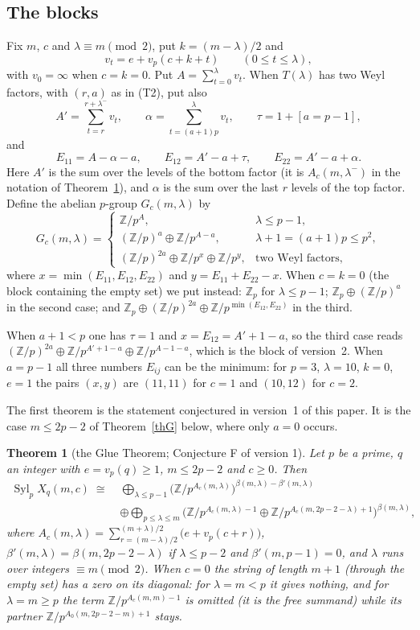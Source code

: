 \documentclass[10pt]{article}
\theoremstyle{ds}
\newtheorem{theorem}{Theorem}
\theoremstyle{dsrem}
\newcommand{\Z}{\mathbb{Z}}
\newcommand{\Syl}{\operatorname{Syl}}
\begin{document}
\subsection{The blocks}
Fix $m$, $c$ and $\lambda\equiv m\pmod2$, put $k=(m-\lambda)/2$ and
\[
v_t=e+v_p(c+k+t)\qquad(0\le t\le\lambda),
\]
with $v_0=\infty$ when $c=k=0$. Put $A=\sum_{t=0}^{\lambda}v_t$. When $T(\lambda)$ has two Weyl factors, with $(r,a)$ as in (T2), put also
\[
A'=\sum_{t=r}^{r+\lambda^-}v_t,\qquad \alpha=\sum_{t=(a+1)p}^{\lambda}v_t,\qquad \tau=1+[a=p-1],
\]
and
\[
E_{11}=A-\alpha-a,\qquad E_{12}=A'-a+\tau,\qquad E_{22}=A'-a+\alpha.
\]
Here $A'$ is the sum over the levels of the bottom factor (it is $A_c(m,\lambda^-)$ in the notation of Theorem~\ref{glue}), and $\alpha$ is the sum over the last $r$ levels of the top factor. Define the abelian $p$-group $G_c(m,\lambda)$ by
\[
G_c(m,\lambda)=\begin{cases}
\Z/p^{A}, & \lambda\le p-1,\\[2pt]
(\Z/p)^{a}\oplus\Z/p^{A-a}, & \lambda+1=(a+1)p\le p^2,\\[2pt]
(\Z/p)^{2a}\oplus\Z/p^{x}\oplus\Z/p^{y}, & \text{two Weyl factors},
\end{cases}
\]
where $x=\min(E_{11},E_{12},E_{22})$ and $y=E_{11}+E_{22}-x$. When $c=k=0$ (the block containing the empty set) we put instead: $\Z_p$ for $\lambda\le p-1$; $\Z_p\oplus(\Z/p)^a$ in the second case; and $\Z_p\oplus(\Z/p)^{2a}\oplus\Z/p^{\min(E_{12},E_{22})}$ in the third.

When $a+1<p$ one has $\tau=1$ and $x=E_{12}=A'+1-a$, so the third case reads $(\Z/p)^{2a}\oplus\Z/p^{A'+1-a}\oplus\Z/p^{A-1-a}$, which is the block of version~2. When $a=p-1$ all three numbers $E_{ij}$ can be the minimum: for $p=3$, $\lambda=10$, $k=0$, $e=1$ the pairs $(x,y)$ are $(11,11)$ for $c=1$ and $(10,12)$ for $c=2$.

The first theorem is the statement conjectured in version~1 of this paper. It is the case $m\le2p-2$ of Theorem~\ref{thG} below, where only $a=0$ occurs.

\begin{theorem}[the Glue Theorem; Conjecture F of version 1]\label{glue}
Let $p$ be a prime, $q$ an integer with $e=v_p(q)\ge1$, $m\le2p-2$ and $c\ge0$. Then
\[
\begin{aligned}\Syl_pX_q(m,c)\;\cong\;&\bigoplus_{\lambda\le p-1}\big(\Z/p^{A_c(m,\lambda)}\big)^{\beta(m,\lambda)-\beta'(m,\lambda)}\\&\oplus\bigoplus_{p\le\lambda\le m}\Big(\Z/p^{A_c(m,\lambda)-1}\oplus\Z/p^{A_c(m,2p-2-\lambda)+1}\Big)^{\beta(m,\lambda)},\end{aligned}
\]
where $A_c(m,\lambda)=\sum_{r=(m-\lambda)/2}^{(m+\lambda)/2}\big(e+v_p(c+r)\big)$, $\beta'(m,\lambda)=\beta(m,2p-2-\lambda)$ if $\lambda\le p-2$ and $\beta'(m,p-1)=0$, and $\lambda$ runs over integers $\equiv m\pmod2$. When $c=0$ the string of length $m+1$ (through the empty set) has a zero on its diagonal: for $\lambda=m<p$ it gives nothing, and for $\lambda=m\ge p$ the term $\Z/p^{A_c(m,m)-1}$ is omitted (it is the free summand) while its partner $\Z/p^{A_0(m,2p-2-m)+1}$ stays.
\end{theorem}
\end{document}
